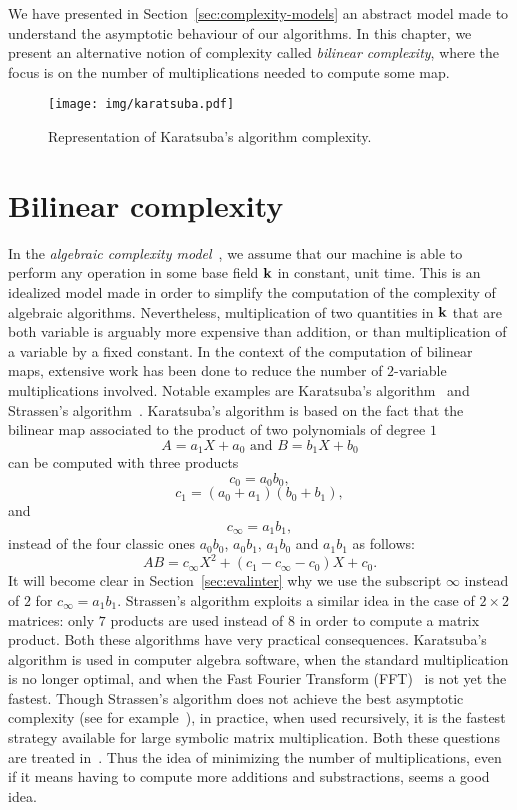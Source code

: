 We have presented in Section~\ref{sec:complexity-models} an abstract model made
to understand the asymptotic behaviour of our algorithms. In this chapter, we
present an alternative notion of complexity called \emph{bilinear complexity},
where the focus is on the number of multiplications needed to compute some map.
\minitoc

\begin{figure}[h]
  \centering
  \texttt{[image: img/karatsuba.pdf]}
  \caption{Representation of Karatsuba's algorithm complexity.}
  \label{fig:karatsuba}
\end{figure}
\clearpage

\section{Bilinear complexity}
\label{sec:bilinear-complexity}

In the \emph{algebraic complexity model}~\cite{BCS13}, we assume that our
machine is able to perform any operation in some base field $\mathbf{k}$ in constant,
unit time. This is an idealized model made in order to simplify the
computation of the complexity of algebraic algorithms. Nevertheless,
multiplication of two quantities in $\mathbf{k}$ that are both variable is arguably more
expensive
than addition, or than multiplication of a variable by a fixed constant. In the
context of the computation of bilinear maps, extensive work has been done to
reduce the number of $2$-variable multiplications involved. Notable examples are
Karatsuba's algorithm~\cite{Karatsuba63} and
Strassen's algorithm~\cite{Strassen69}. Karatsuba's algorithm is
based on the fact that the bilinear map associated to the product of two
polynomials of degree $1$
\[
  A = a_1 X + a_0\text{ and }B = b_1 X + b_0
\]
can be computed with three products
\[
  c_0 = a_0b_0,
\]
\[
  c_1 = (a_0+a_1)(b_0+b_1),
\]
and
\[
  c_\infty = a_1b_1,
\]
instead
of the four classic ones $a_0b_0$, $a_0b_1$, $a_1b_0$ and $a_1b_1$ as follows:
\[
  AB = c_\infty X^2 + (c_1-c_\infty-c_0) X + c_0.
\]
It will become clear in Section~\ref{sec:evalinter} why we use the subscript
$\infty$ instead of $2$ for $c_\infty = a_1b_1$. Strassen's algorithm
exploits a similar idea in the case of $2\times2$ matrices: only $7$ products
are used instead of $8$ in order to compute a matrix product. Both these
algorithms have very practical consequences. Karatsuba's algorithm is used in
computer algebra software, when the standard multiplication is no longer
optimal, and when the Fast Fourier Transform (FFT)~\cite{CT65, SS71} is not yet
the fastest. Though Strassen's algorithm does not achieve the best asymptotic
complexity (see for example~\cite{CW90, AW21}), in practice, when used
recursively, it is the fastest strategy available for large symbolic matrix
multiplication. Both these questions are treated in~\cite{GG13}. Thus the idea
of minimizing the number of multiplications, even if it means having to compute
more additions and substractions, seems a good idea.

